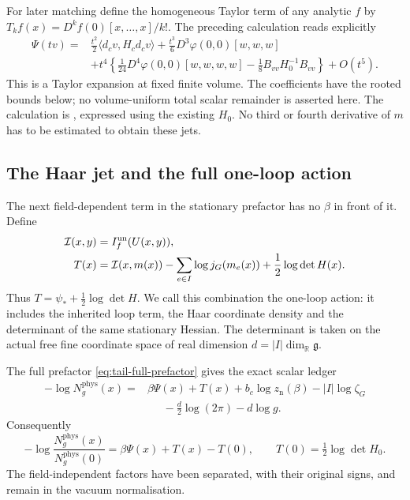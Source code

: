 \documentclass[11pt,reqno]{amsart}
\numberwithin{equation}{section}
\theoremstyle{definition}
\theoremstyle{remark}
\newcommand{\R}{\mathbb R}
\newcommand{\g}{\mathfrak g}
\begin{document}
For later matching define the homogeneous Taylor term of
any analytic \(f\) by
\(T_kf(x)=D^kf(0)[x,\ldots,x]/k!\).
The preceding calculation reads explicitly
\begin{equation}
 \begin{split}
 \Psi(tv)
  ={}&\frac{t^2}{2}\langle d_cv,H_cd_cv\rangle
       +\frac{t^3}{6}D^3\varphi(0,0)[w,w,w]\\
    &+t^4\left\{\frac1{24}D^4\varphi(0,0)[w,w,w,w]
                     -\frac18B_{vv}H_0^{-1}B_{vv}\right\}
       +O(t^5).
 \end{split}
 \label{eq:matching-classical-diagonal}
\end{equation}
This is a Taylor expansion at fixed finite volume.
The coefficients have the rooted bounds below; no
volume-uniform total scalar remainder is asserted here.
The calculation is
\cite[Lemma~36.2 and (36.5), p.~229]{Main}, expressed
using the existing \(H_0\). No third or fourth derivative
of \(m\) has to be estimated to obtain these jets.

\subsection{The Haar jet and the full one-loop action}

The next field-dependent term in the stationary prefactor
has no \(\beta\) in front of it. Define
\begin{equation}
 \begin{split}
 \mathcal I(x,y)&=I_f^{\rm un}(U(x,y)),\\
 T(x)&=\mathcal I(x,m(x))
           -\sum_{e\in I}\log j_G(m_e(x))
                         +\frac12\log\det H(x).
 \end{split}
 \label{eq:matching-one-loop-action}
\end{equation}
Thus \(T=\psi_*+\tfrac12\log\det H\).
We call this combination the one-loop action: it includes
the inherited loop term, the Haar coordinate density and
the determinant of the same stationary Hessian.
The determinant is taken on the actual free fine
coordinate space of real dimension \(d=|I|\dim_\R\g\).

The full prefactor \eqref{eq:tail-full-prefactor} gives
the exact scalar ledger
\begin{equation}
 \begin{split}
 -\log N_g^{\mathrm{phys}}(x)
   ={}&\beta\Psi(x)+T(x)+b_c\log z_{\mathrm n}(\beta)
           -|I|\log\zeta_G\\
     &\hspace{17pt}-\frac d2\log(2\pi)-d\log g .
 \end{split}
 \label{eq:matching-prefactor-ledger}
\end{equation}
Consequently
\[
 -\log\frac{N_g^{\mathrm{phys}}(x)}{N_g^{\mathrm{phys}}(0)}
                    =\beta\Psi(x)+T(x)-T(0),
 \qquad T(0)=\tfrac12\log\det H_0 .
\]
The field-independent factors have been separated, with
their original signs, and remain in the vacuum
normalisation.
\end{document}
